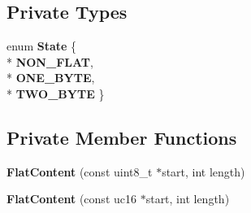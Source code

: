 \subsection*{Private Types}
\begin{DoxyCompactItemize}
\item 
enum {\bfseries State} \{ \\*
{\bfseries N\+O\+N\+\_\+\+F\+L\+AT}, 
\\*
{\bfseries O\+N\+E\+\_\+\+B\+Y\+TE}, 
\\*
{\bfseries T\+W\+O\+\_\+\+B\+Y\+TE}
 \}\hypertarget{classv8_1_1internal_1_1_string_1_1_flat_content_ad9fdde994bd9b70d72556857839a6c1f}{}\label{classv8_1_1internal_1_1_string_1_1_flat_content_ad9fdde994bd9b70d72556857839a6c1f}

\end{DoxyCompactItemize}
\subsection*{Private Member Functions}
\begin{DoxyCompactItemize}
\item 
{\bfseries Flat\+Content} (const uint8\+\_\+t $\ast$start, int length)\hypertarget{classv8_1_1internal_1_1_string_1_1_flat_content_a53b9aec7e381c3729fd369921bbae42f}{}\label{classv8_1_1internal_1_1_string_1_1_flat_content_a53b9aec7e381c3729fd369921bbae42f}

\item 
{\bfseries Flat\+Content} (const uc16 $\ast$start, int length)\hypertarget{classv8_1_1internal_1_1_string_1_1_flat_content_a1e076408e7580e20d7772f0a049f03a2}{}\label{classv8_1_1internal_1_1_string_1_1_flat_content_a1e076408e7580e20d7772f0a049f03a2}

\end{DoxyCompactItemize}
